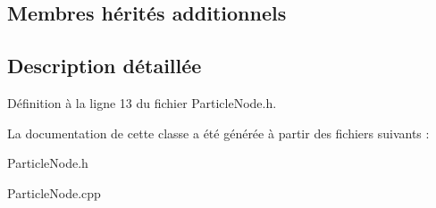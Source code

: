 \subsection*{Membres hérités additionnels}


\subsection{Description détaillée}


Définition à la ligne 13 du fichier Particle\+Node.\+h.



La documentation de cette classe a été générée à partir des fichiers suivants \+:\begin{DoxyCompactItemize}
\item 
Particle\+Node.\+h\item 
Particle\+Node.\+cpp\end{DoxyCompactItemize}
